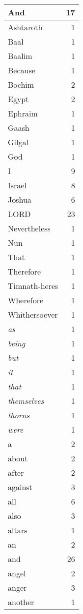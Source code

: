 \begin{center}
\begin{longtable}{l|r}
\hline \hline
\endlastfoot
And & 17 \\ \hline
Ashtaroth & 1 \\ \hline
Baal & 1 \\ \hline
Baalim & 1 \\ \hline
Because & 1 \\ \hline
Bochim & 2 \\ \hline
Egypt & 2 \\ \hline
Ephraim & 1 \\ \hline
Gaash & 1 \\ \hline
Gilgal & 1 \\ \hline
God & 1 \\ \hline
I & 9 \\ \hline
Israel & 8 \\ \hline
Joshua & 6 \\ \hline
LORD & 23 \\ \hline
Nevertheless & 1 \\ \hline
Nun & 1 \\ \hline
That & 1 \\ \hline
Therefore & 1 \\ \hline
Timnath-heres & 1 \\ \hline
Wherefore & 1 \\ \hline
Whithersoever & 1 \\ \hline
\emph{as} & 1 \\ \hline
\emph{being} & 1 \\ \hline
\emph{but} & 1 \\ \hline
\emph{it} & 1 \\ \hline
\emph{that} & 1 \\ \hline
\emph{themselves} & 1 \\ \hline
\emph{thorns} & 1 \\ \hline
\emph{were} & 1 \\ \hline
a & 2 \\ \hline
about & 2 \\ \hline
after & 2 \\ \hline
against & 3 \\ \hline
all & 6 \\ \hline
also & 3 \\ \hline
altars & 1 \\ \hline
an & 2 \\ \hline
and & 26 \\ \hline
angel & 2 \\ \hline
anger & 3 \\ \hline
another & 1 \\ \hline

\end{longtable}
\end{center}
